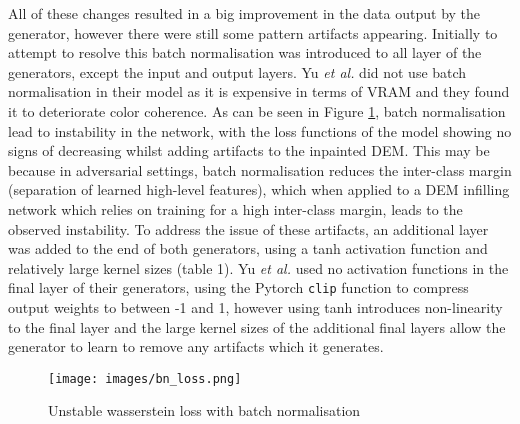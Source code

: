 \documentclass[twocolumn]{article}
\begin{document}
All of these changes resulted in a big improvement in the data output by the generator, however there were still some pattern artifacts appearing.
Initially to attempt to resolve this batch normalisation was introduced to all layer of the generators, except the input and output layers.
Yu \emph{et al.} did not use batch normalisation in their model as it is expensive in terms of VRAM and they found it to deteriorate color coherence.
As can be seen in Figure \ref{fig:bn_wloss}, batch normalisation lead to instability in the network, with the loss functions of the model showing no signs of decreasing whilst adding artifacts to the inpainted DEM.
This may be because in adversarial settings, batch normalisation reduces the inter-class margin (separation of learned high-level features), which when applied to a DEM infilling network which relies on training for a high inter-class margin, leads to the observed instability\autocite{kongWhyDoesBatch2023}.
To address the issue of these artifacts, an additional layer was added to the end of both generators, using a tanh activation function and relatively large kernel sizes (table 1).
Yu \emph{et al.} used no activation functions in the final layer of their generators, using the Pytorch \texttt{clip} function to compress output weights to between -1 and 1, however using tanh introduces non-linearity to the final layer and the large kernel sizes of the additional final layers allow the generator to learn to remove any artifacts which it generates.

\begin{figure}[htbp]
\centering
\texttt{[image: images/bn\_loss.png]}
\caption{\label{fig:bn_wloss}Unstable wasserstein loss with batch normalisation}
\end{figure}
\end{document}
